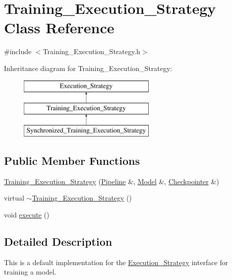 \hypertarget{class_training___execution___strategy}{
\section{Training\_\-Execution\_\-Strategy Class Reference}
\label{class_training___execution___strategy}
}


{\ttfamily \#include $<$Training\_\-Execution\_\-Strategy.h$>$}

Inheritance diagram for Training\_\-Execution\_\-Strategy:\begin{figure}[H]
\begin{center}
\leavevmode
\includegraphics[height=3cm]{class_training___execution___strategy}
\end{center}
\end{figure}
\subsection*{Public Member Functions}
\begin{DoxyCompactItemize}
\item 
\hyperlink{class_training___execution___strategy_a3909c97f68df5715cb7dc55b81b8cf56}{Training\_\-Execution\_\-Strategy} (\hyperlink{class_pipeline}{Pipeline} \&, \hyperlink{class_model}{Model} \&, \hyperlink{class_checkpointer}{Checkpointer} \&)
\item 
virtual \hyperlink{class_training___execution___strategy_a5e833297a246164949efd7a6088b2bbd}{$\sim$Training\_\-Execution\_\-Strategy} ()
\item 
void \hyperlink{class_training___execution___strategy_adc14f066d7a325e87035fb8224097c47}{execute} ()
\end{DoxyCompactItemize}


\subsection{Detailed Description}
This is a default implementation for the \hyperlink{class_execution___strategy}{Execution\_\-Strategy} interface for training a model.

